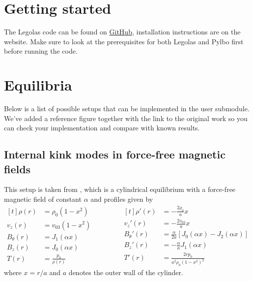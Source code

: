 \documentclass[12pt]{article}
\begin{document}
\pagestyle{fancy}
\renewcommand\headheight{24pt}
\renewcommand\footrulewidth{0.4pt}

\section*{Getting started}
The Legolas code can be found on \href{https://github.com/n-claes/legolas}{GitHub}, installation instructions are on the website. Make sure to look at the prerequisites for both Legolas and Pylbo first before running the code.

\section{Equilibria}
Below is a list of possible setups that can be implemented in the user submodule. We've added a reference figure together with the link to the original work so you can check your implementation and compare with known results.

\subsection{Internal kink modes in force-free magnetic fields}
This setup is taken from \citet{goedbloed2018}, which is a cylindrical equilibrium with a force-free magnetic field of constant $\alpha$ and profiles given by
\begin{equation*}
	\begin{aligned}[t]
		\rho(r) &= \rho_0\left(1 - x^2\right) \\
		v_z(r) &= v_{03}\left(1 - x^2\right) \\
		B_\theta(r) &= J_1(\alpha x) \\
		B_z(r) &= J_0(\alpha x) \\
		T(r) &= \frac{p_0}{\rho(r)}
	\end{aligned}
	\qquad\qquad
	\begin{aligned}[t]
		\rho'(r) &= -\frac{2\rho_0}{a} x \\
		v_z'(r) &= -\frac{2v_{03}}{a} x \\
		B_\theta'(r) &= \frac{\alpha}{2a} \left[J_0(\alpha x) - J_2(\alpha x)\right] \\
		B_z'(r) &= -\frac{\alpha}{a} J_1(\alpha x) \\
		T'(r) &= \frac{2 r p_0}{a^2\rho_0(1 - x^2)^2}
	\end{aligned}
\end{equation*}
where $x = r / a$ and $a$ denotes the outer wall of the cylinder.
\end{document}
